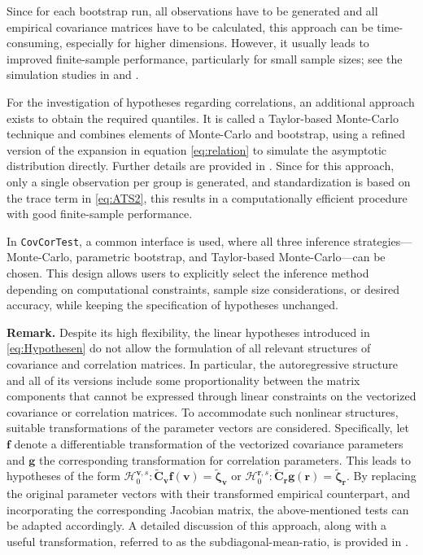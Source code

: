 Since for each bootstrap run, all observations have to be generated and all
empirical covariance matrices have to be calculated, this approach can be
time-consuming, especially for higher dimensions. However, it usually leads to
improved finite-sample performance, particularly for small sample sizes; see
the simulation studies in \citet{sattler2022} and \citet{sattler2023}.

For the investigation of hypotheses regarding correlations, an additional
approach exists to obtain the required quantiles. It is called a Taylor-based
Monte-Carlo technique and combines elements of Monte-Carlo and bootstrap, using
a refined version of the expansion in equation \eqref{eq:relation} to simulate the
asymptotic distribution directly. Further details are provided in
\citet{sattler2023}. Since for this approach, only a single observation per
group is generated, and standardization is based on the trace term in
\eqref{eq:ATS2}, this results in a computationally efficient procedure with good
finite-sample performance.

In \texttt{CovCorTest}, a common interface is used, where all three inference
strategies---Monte-Carlo, parametric bootstrap, and Taylor-based Monte-Carlo---can
be chosen. This design allows users to explicitly select the inference method
depending on computational constraints, sample size considerations, or desired
accuracy, while keeping the specification of hypotheses unchanged.

\textbf{Remark.}
Despite its high flexibility, the linear hypotheses introduced in
\eqref{eq:Hypothesen} do not allow the formulation of all relevant structures of
covariance and correlation matrices. In particular, the autoregressive
structure and all of its versions include some proportionality between the
matrix components that cannot be expressed through linear constraints on the
vectorized covariance or correlation matrices. To accommodate such nonlinear structures, suitable transformations of the
parameter vectors are considered. Specifically, let \(\boldsymbol{f}\) denote a
differentiable transformation of the vectorized covariance parameters and
\(\boldsymbol{g}\) the corresponding transformation for correlation parameters. This leads
to hypotheses of the form
\(\mathcal{H}_0^{\boldsymbol{v},s}
:
\widetilde{\boldsymbol{C}}_{\boldsymbol{v}} \boldsymbol{f}(\boldsymbol{v})
=
\widetilde{\boldsymbol{\zeta}}_{\boldsymbol{v}}\)
or
\(\mathcal{H}_0^{\boldsymbol{r},s}
:
\widetilde{\boldsymbol{C}}_{\boldsymbol{r}} \boldsymbol{g}(\boldsymbol{r})
=
\widetilde{\boldsymbol{\zeta}}_{\boldsymbol{r}}\). By replacing the original parameter vectors with their transformed empirical
counterpart, and incorporating the corresponding Jacobian matrix, the
above-mentioned tests can be adapted accordingly. A detailed discussion of
this approach, along with a useful transformation, referred to as the
subdiagonal-mean-ratio, is provided in \citet{sattler2024a}.

